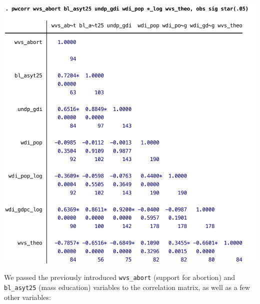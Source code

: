 \begin{table}[htp]
	\includegraphics[scale=.5]{images/abortion_pwcorr.pdf}

	\caption[Correlation matrix with ]{\label{tbl:pwcorr}%
	Correlation matrix produced with \texttt{pwcorr, obs star(.05)}. %
  \qog}
\end{table}%

We passed the previously introduced \texttt{wvs\_abort} (support for abortion) and \texttt{bl\_asyt25} (mass education) variables to the correlation matrix, as well as a few other variables:

